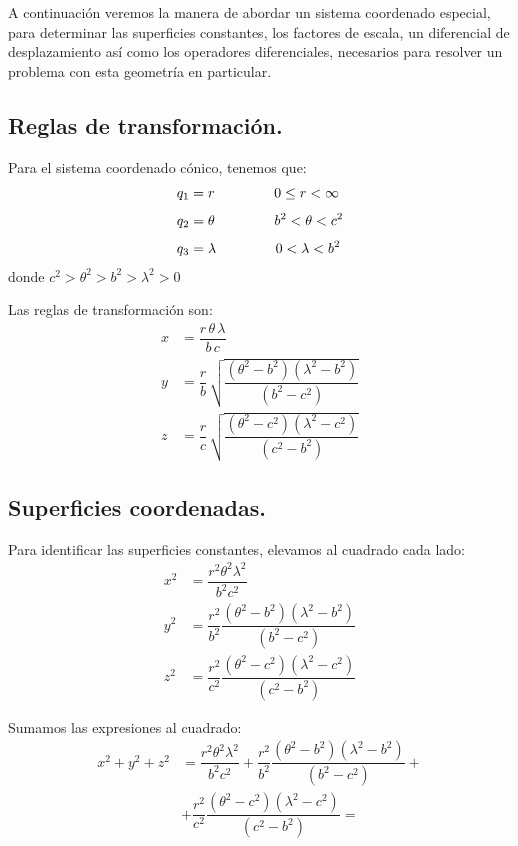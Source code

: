 A continuación veremos la manera de abordar un sistema coordenado especial, para determinar las superficies constantes, los factores de escala, un diferencial de desplazamiento así como los operadores diferenciales, necesarios para resolver un problema con esta geometría en particular.

\subsection{Reglas de transformación.}

Para el sistema coordenado cónico, tenemos que:
\begin{align*}
q_{1} &= r \hspace{1.5cm} 0 \leq r < \infty \\[0.35em]
q_{2} &= \theta \hspace{1.5cm} b^{2} < \theta < c^{2} \\[0.35em]
q_{3} &= \lambda \hspace{1.5cm} 0 < \lambda < b^{2}
\end{align*}
donde $c^{2} > \theta^{2} > b^{2} > \lambda^{2} > 0$
\par
Las reglas de transformación son:
\begin{align*}
x &= \dfrac{r \, \theta \, \lambda}{b \, c} \\[0.5em]
y &= \dfrac{r}{b} \, \sqrt{\dfrac{(\theta^{2} - b^{2})(\lambda^{2} - b^{2})}{(b^{2} - c^{2})}} \\[0.5em]
z &= \dfrac{r}{c} \, \sqrt{\dfrac{(\theta^{2} - c^{2})(\lambda^{2} - c^{2})}{(c^{2} - b^{2})}}
\end{align*}

\subsection{Superficies coordenadas.}

Para identificar las superficies constantes, elevamos al cuadrado cada lado:
\begin{align*}
x^{2} &= \dfrac{r^{2} \theta^{2} \lambda^{2}}{b^{2} c^{2}} \\[0.5em]
y^{2} &= \dfrac{r^{2}}{b^{2}} \dfrac{(\theta^{2} - b^{2})(\lambda^{2} - b^{2})}{(b^{2} - c^{2})} \\[0.5em]
z^{2} &= \dfrac{r^{2}}{c^{2}} \dfrac{(\theta^{2} - c^{2})(\lambda^{2} - c^{2})}{(c^{2} - b^{2})}
\end{align*}

Sumamos las expresiones al cuadrado:
\begin{align*}
x^{2} + y^{2} + z^{2} &= \dfrac{r^{2} \theta^{2} \lambda^{2}}{b^{2} c^{2}} + \dfrac{r^{2}}{b^{2}} \dfrac{(\theta^{2} - b^{2})(\lambda^{2} - b^{2})}{(b^{2} - c^{2})} + \\[0.5em]
&+ \dfrac{r^{2}}{c^{2}} \dfrac{(\theta^{2} - c^{2})(\lambda^{2} - c^{2})}{(c^{2} - b^{2})} =
\end{align*}

